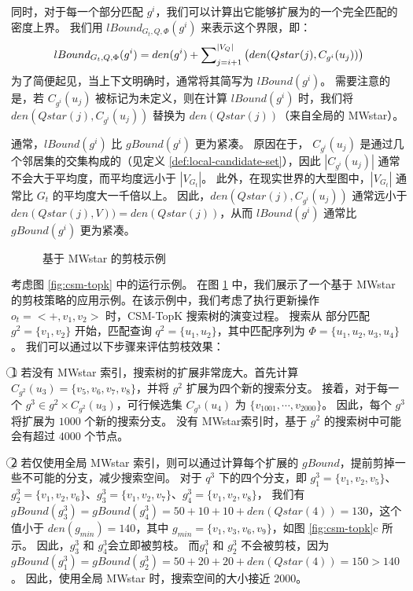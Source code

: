 同时，对于每一个部分匹配 $g^i$，我们可以计算出它能够扩展为的一个完全匹配的密度上界。
我们用 $lBound_{G_t, Q, \Phi}(g^i)$ 来表示这个界限，即：
\begin{equation}
    lBound_{G_t, Q, \Phi}(g^i) \\ = den(g^i) + \sum\nolimits_{j=i+1}^{|V_Q|} \left(den(Qstar(j), C_{g^i}(u_j))\right)
    \end{equation}
为了简便起见，当上下文明确时，通常将其简写为 $lBound(g^i)$。
需要注意的是，若 $C_{g^i}(u_j)$ 被标记为未定义，则在计算 $lBound(g^i)$ 时，我们将 $den(Qstar(j), C_{g^i}(u_j))$ 替换为 $den(Qstar(j))$（来自全局的 MWstar）。

通常，$lBound(g^i)$ 比 $gBound(g^i)$ 更为紧凑。
原因在于， $C_{g^i}(u_j)$ 是通过几个邻居集的交集构成的（见定义 \ref{def:local-candidate-set}），因此 $|C_{g^i}(u_j)|$ 通常不会大于平均度，而平均度远小于 $|V_{G_t}|$。
此外，在现实世界的大型图中，$|V_{G_t}|$ 通常比 $G_t$ 的平均度大一千倍以上。
因此，$den(Qstar(j), C_{g^i}(u_j))$ 通常远小于 $den(Qstar(j), V)) = den(Qstar(j))$，从而 $lBound(g^i)$ 通常比 $gBound(g^i)$ 更为紧凑。

\begin{figure}[h!]
\centering
{}
\caption{基于 MWstar 的剪枝示例}
\label{fig:exp:mwstar:pruning}
\end{figure}

考虑图 \ref{fig:csm-topk} 中的运行示例。
在图 \ref{fig:exp:mwstar:pruning} 中，我们展示了一个基于 MWstar 的剪枝策略的应用示例。在该示例中，我们考虑了执行更新操作 $o_t = <+,v_1,v_2>$ 时，CSM-TopK 搜索树的演变过程。
搜索从 部分匹配$g^2=\{v_1, v_2\}$ 开始，匹配查询 $q^2=\{u_1, u_2\}$，其中匹配序列为 $\Phi=\{u_1, u_2, u_3, u_4\}$。
我们可以通过以下步骤来评估剪枝效果：

\textcircled{1} 若没有 MWstar 索引，搜索树的扩展非常庞大。首先计算 $C_{g^2}(u_3)=\{v_5, v_6, v_7, v_8\}$，并将 $g^2$ 扩展为四个新的搜索分支。
接着，对于每一个 $g^3 \in g^2 \times C_{g^2}(u_3)$，可行候选集 $C_{g^3}(u_4)$ 为 $\{v_{1001}, \cdots, v_{2000}\}$。
因此，每个 $g^3$ 将扩展为 $1000$ 个新的搜索分支。
没有 MWstar索引时，基于 $g^2$ 的搜索树中可能会有超过 $4000$ 个节点。

\textcircled{2} 若仅使用全局 MWstar 索引，则可以通过计算每个扩展的 $gBound$，提前剪掉一些不可能的分支，减少搜索空间。
对于 $q^3$ 下的四个分支，即 $g_1^3=\{v_1, v_2, v_5\}$、$g_2^3=\{v_1, v_2, v_6\}$、$g_3^3=\{v_1, v_2, v_7\}$、$g_4^3=\{v_1, v_2, v_8\}$，
我们有 $gBound(g_3^3)=gBound(g_4^3)=50+10+10+den(Qstar(4))=130$，这个值小于 $den(g_{min})=140$，其中 $g_{min}=\{v_1, v_3, v_6, v_9\}$，如图 \ref{fig:csm-topk}c 所示。
因此，$g_3^3$ 和 $g_4^3$会立即被剪枝。
而$g_1^3$ 和 $g_2^3$ 不会被剪枝，因为 $gBound(g_1^3) = gBound(g_2^3) = 50+20+20+den(Qstar(4)) = 150 > 140$。
因此，使用全局 MWstar 时，搜索空间的大小接近 $2000$。

